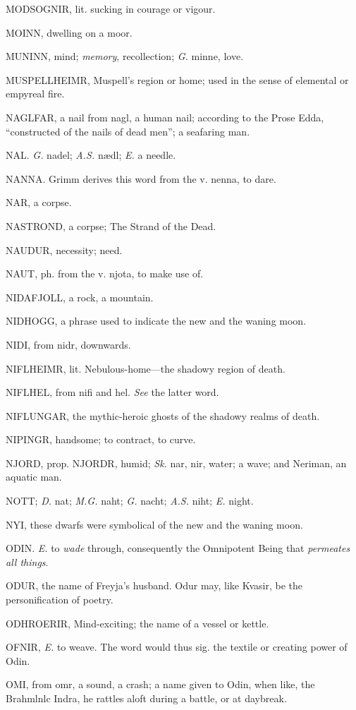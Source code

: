 MODSOGNIR, lit. sucking in courage or vigour.

MOINN, dwelling on a moor.

MUNINN, mind; \emph{memory}, recollection; \emph{G.} minne, love.

MUSPELLHEIMR, Muspell's region or home; used in the sense of elemental
or empyreal fire.

NAGLFAR, a nail from nagl, a human nail; according to the Prose Edda,
``constructed of the nails of dead men''; a seafaring man.

NAL. \emph{G.} nadel; \emph{A.S.} nædl; \emph{E.} a needle.

NANNA. Grimm derives this word from the v. nenna, to dare.

NAR, a corpse.

NASTROND, a corpse; The Strand of the Dead.

NAUDUR, necessity; need.

NAUT, ph. from the v. njota, to make use of.

NIDAFJOLL, a rock, a mountain.

NIDHOGG, a phrase used to indicate the new and the waning moon.

NIDI, from nidr, downwards.

NIFLHEIMR, lit. Nebulous-home—the shadowy region of death.

NIFLHEL, from nifi and hel. \emph{See} the latter word.

NIFLUNGAR, the mythic-heroic ghosts of the shadowy realms of death.

NIPINGR, handsome; to contract, to curve.

NJORD, prop. NJORDR, humid; \emph{Sk.} nar, nir, water; a wave; and
Neriman, an aquatic man.

NOTT; \emph{D.} nat; \emph{M.G.} naht; \emph{G.} nacht; \emph{A.S.} niht; \emph{E.} night.

NYI, these dwarfs were symbolical of the new and the waning moon.

ODIN. \emph{E.} to \emph{wade} through, consequently the Omnipotent Being that
\emph{permeates all things}.

ODUR, the name of Freyja's husband. Odur may, like Kvasir, be the
personification of poetry.

ODHROERIR, Mind-exciting; the name of a vessel or kettle.

OFNIR, \emph{E.} to weave. The word would thus sig. the textile or creating
power of Odin.

OMI, from omr, a sound, a crash; a name given to Odin, when like, the
Brahmlnlc Indra, he rattles aloft during a battle, or at daybreak.

